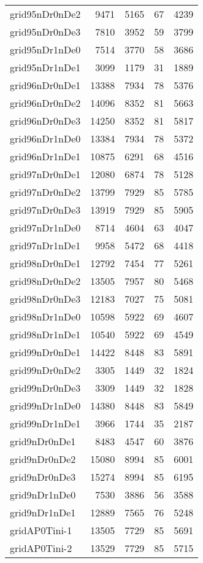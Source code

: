 \begin{longtable}{lrrrr}
grid95nDr0nDe2 & 9471 & 5165 & 67 & 4239 \\
grid95nDr0nDe3 & 7810 & 3952 & 59 & 3799 \\
grid95nDr1nDe0 & 7514 & 3770 & 58 & 3686 \\
grid95nDr1nDe1 & 3099 & 1179 & 31 & 1889 \\
grid96nDr0nDe1 & 13388 & 7934 & 78 & 5376 \\
grid96nDr0nDe2 & 14096 & 8352 & 81 & 5663 \\
grid96nDr0nDe3 & 14250 & 8352 & 81 & 5817 \\
grid96nDr1nDe0 & 13384 & 7934 & 78 & 5372 \\
grid96nDr1nDe1 & 10875 & 6291 & 68 & 4516 \\
grid97nDr0nDe1 & 12080 & 6874 & 78 & 5128 \\
grid97nDr0nDe2 & 13799 & 7929 & 85 & 5785 \\
grid97nDr0nDe3 & 13919 & 7929 & 85 & 5905 \\
grid97nDr1nDe0 & 8714 & 4604 & 63 & 4047 \\
grid97nDr1nDe1 & 9958 & 5472 & 68 & 4418 \\
grid98nDr0nDe1 & 12792 & 7454 & 77 & 5261 \\
grid98nDr0nDe2 & 13505 & 7957 & 80 & 5468 \\
grid98nDr0nDe3 & 12183 & 7027 & 75 & 5081 \\
grid98nDr1nDe0 & 10598 & 5922 & 69 & 4607 \\
grid98nDr1nDe1 & 10540 & 5922 & 69 & 4549 \\
grid99nDr0nDe1 & 14422 & 8448 & 83 & 5891 \\
grid99nDr0nDe2 & 3305 & 1449 & 32 & 1824 \\
grid99nDr0nDe3 & 3309 & 1449 & 32 & 1828 \\
grid99nDr1nDe0 & 14380 & 8448 & 83 & 5849 \\
grid99nDr1nDe1 & 3966 & 1744 & 35 & 2187 \\
grid9nDr0nDe1 & 8483 & 4547 & 60 & 3876 \\
grid9nDr0nDe2 & 15080 & 8994 & 85 & 6001 \\
grid9nDr0nDe3 & 15274 & 8994 & 85 & 6195 \\
grid9nDr1nDe0 & 7530 & 3886 & 56 & 3588 \\
grid9nDr1nDe1 & 12889 & 7565 & 76 & 5248 \\
gridAP0Tini-1 & 13505 & 7729 & 85 & 5691 \\
gridAP0Tini-2 & 13529 & 7729 & 85 & 5715 \\

\end{longtable}
